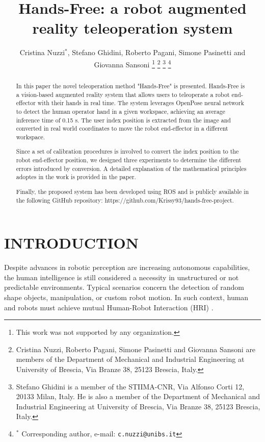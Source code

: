 \documentclass[a4paper, 10 pt, conference]{ieeeconf}      %
\title{\LARGE \bf
Hands-Free: a robot augmented reality teleoperation system
}
\author{Cristina Nuzzi$^{*}$, Stefano Ghidini, Roberto Pagani, Simone Pasinetti and Giovanna Sansoni %
\thanks{This work was not supported by any organization.}%
\thanks{Cristina Nuzzi, Roberto Pagani, Simone Pasinetti and Giovanna Sansoni are members of the Department of Mechanical and Industrial Engineering at University of Brescia, Via Branze 38, 25123 Brescia, Italy.}
\thanks{Stefano Ghidini is a member of the STIIMA-CNR, Via Alfonso Corti 12, 20133 Milan, Italy. He is also a member of the Department of Mechanical and Industrial Engineering at University of Brescia, Via Branze 38, 25123 Brescia, Italy.}
\thanks{$^{*}$ Corresponding author, e-mail: {\tt\small c.nuzzi@unibs.it}}%
}
\begin{document}
\maketitle
\thispagestyle{empty}
\pagestyle{empty}

\begin{abstract}

In this paper the novel teleoperation method "Hands-Free" is presented.
Hands-Free is a vision-based augmented reality system that allows users to teleoperate a robot end-effector with their hands in real time. The system leverages OpenPose neural network to detect the human operator hand in a given workspace, achieving an average inference time of 0.15 s. The user index position is extracted from the image and converted in real world coordinates to move the robot end-effector in a different workspace. 

Since a set of calibration procedures is involved to convert the index position to the robot end-effector position, we designed three experiments to determine the different errors introduced by conversion.
A detailed explanation of the mathematical principles adoptes in the work is provided in the paper. 

Finally, the proposed system has been developed using ROS and is publicly available in the following GitHub repository: https://github.com/Krissy93/hands-free-project.

\end{abstract}

\section{INTRODUCTION}
Despite advances in robotic perception are increasing autonomous capabilities, the human intelligence is still considered a necessity in unstructured or not predictable environments. Typical scenarios concern the detection of random shape objects, manipulation, or custom robot motion. In such context, human and robots must achieve mutual Human-Robot Interaction (HRI) \cite{Yanco2002}. 
\end{document}
